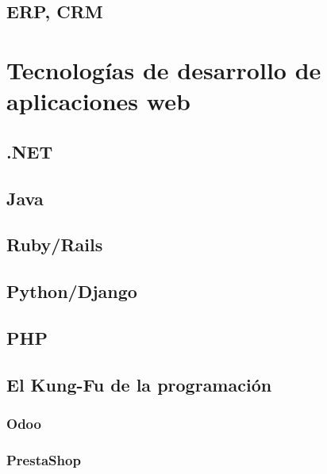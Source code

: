 \documentclass[a4paper,12pt,spanish]{sphinxmanual}
\begin{document}
\subsection{ERP, CRM}
\label{\detokenize{introduccion:erp-crm}}

\section{Tecnologías de desarrollo de aplicaciones web}
\label{\detokenize{introduccion:tecnologias-de-desarrollo-de-aplicaciones-web}}

\subsection{.NET}
\label{\detokenize{introduccion:net}}

\subsection{Java}
\label{\detokenize{introduccion:java}}

\subsection{Ruby/Rails}
\label{\detokenize{introduccion:ruby-rails}}

\subsection{Python/Django}
\label{\detokenize{introduccion:python-django}}

\subsection{PHP}
\label{\detokenize{introduccion:php}}

\subsection{El Kung-Fu de la programación}
\label{\detokenize{introduccion:el-kung-fu-de-la-programacion}}

\subsubsection{Odoo}
\label{\detokenize{introduccion:odoo}}

\subsubsection{PrestaShop}
\label{\detokenize{introduccion:prestashop}}
\end{document}
